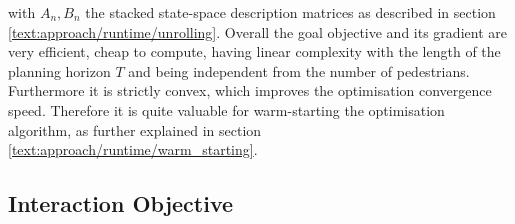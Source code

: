 with $A_n, B_n$ the stacked state-space description matrices as described in section \ref{text:approach/runtime/unrolling}. 
\newline
Overall the goal objective and its gradient are very efficient, cheap to compute, having linear complexity with the length of the planning horizon $T$ and being independent from the number of pedestrians. Furthermore it is strictly convex, which improves the optimisation convergence speed. Therefore it is quite valuable for warm-starting the optimisation algorithm, as further explained in section \ref{text:approach/runtime/warm_starting}.


\subsection{Interaction Objective}
\label{text:approach/objective/interactive}





